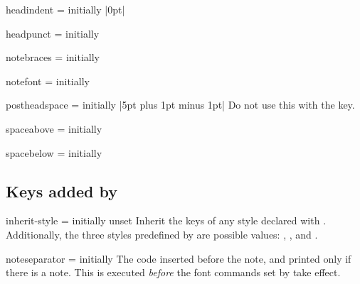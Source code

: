 \documentclass{ltxdoc}
\newcommand{\ttbraces}[1]{\braces{\texttt{#1}}}
\begin{document}
\begin{docKey}{headindent}
  {=}
  {initially |0pt|}

\end{docKey}

\begin{docKey}{headpunct}
  {=}
  {initially \ttbraces{.}}

\end{docKey}

\begin{docKey}{notebraces}
  {=}
  {initially \ttbraces{(}\ttbraces{)}}

\end{docKey}

\begin{docKey}{notefont}
  {=}
  {initially }

\end{docKey}

\begin{docKey}{postheadspace}
  {=}
  {initially |5pt plus 1pt minus 1pt|}
Do not use this with the  key.
\end{docKey}

\begin{docKey}{spaceabove}
  {=}
  {initially }

\end{docKey}

\begin{docKey}{spacebelow}
  {=}
  {initially }

\end{docKey}

\subsection{Keys added by }

\begin{docKey}{inherit-style}
  {=}
  {initially unset}
Inherit the keys of any style declared with .
Additionally, the three styles predefined by  are possible values: , , and .
\end{docKey}

\begin{docKey}{noteseparator}
  {=}
  {initially \textvisiblespace}
The code inserted before the note, and printed only if there is a note. This is executed \emph{before} the font commands set by  take effect.
\end{docKey}
\end{document}
